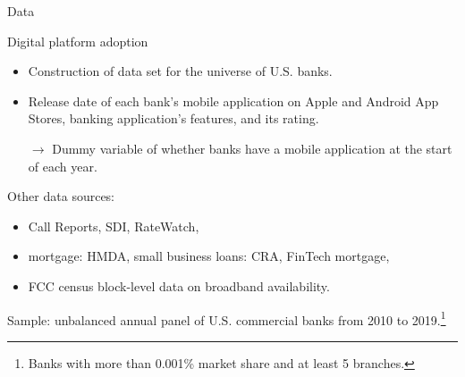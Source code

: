 \documentclass[notes,10pt, aspectratio=169]{beamer}
\newenvironment{wideitemize}{\itemize\addtolength{\itemsep}{10pt}}{\enditemize}
\begin{document}
\begin{frame}{Data}
    
    \begin{wideitemize}
        \item Digital platform adoption
        \vspace{0.2cm}
        \begin{itemize}
            \item Construction of data set for the universe of U.S. banks. 
            \item Release date of each bank's mobile application on Apple and Android App Stores, banking application's features, and its rating. 
            \item[$\rightarrow$] Dummy variable of whether banks have a mobile application at the start of each year.
   
        \end{itemize} 

        \item Other data sources: 
        \begin{itemize} 
            \vspace{0.2cm}
   
            \item Call Reports, SDI, RateWatch,
            \item mortgage: HMDA, small business loans: CRA, FinTech mortgage,
            \item FCC census block-level data on broadband availability.
        \end{itemize}
        \item Sample: unbalanced annual panel of U.S. commercial banks from 2010 to 2019.\footnote{Banks with more than 0.001\% market share and at least 5 branches.}
    \end{wideitemize}
    
\end{frame}
    


\end{document}

